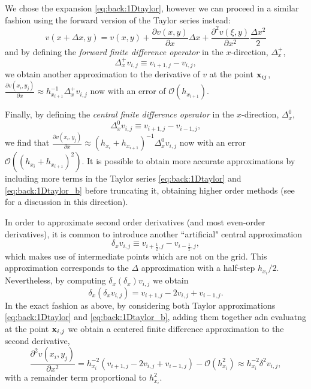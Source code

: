We chose the expansion \eqref{eq:back:1Dtaylor}, however we can proceed in a
similar fashion using the forward version of the Taylor series instead:
\begin{equation}\label{eq:back:1Dtaylor_b}
v(x+\Delta x,y)=
v(x,y)+\frac{\partial v(x,y)}{\partial x}\Delta x + \frac{\partial^2 v(\xi,y)}{\partial x^2}\frac{\Delta x^2}{2}
\end{equation}
and by defining the \emph{forward finite difference operator} in the
$x$-direction, $\Delta^{+}_{x}$,
\begin{equation}\label{eq:back:1DforwardOp}
\Delta^{+}_{x}v_{i,j}\equiv v_{i+1,j}-v_{i,j},
\end{equation}
%
we obtain another approximation to the derivative of $v$ at the point
$\mathbf{x}_{ij}$,\linebreak $\frac{\partial v(x_i,y_j)}{\partial x} \approx h_{x_{i+1}}^{-1}
\Delta^{+}_{x}v_{i,j}$ now with an error of $\mathscr{O}(h_{x_{i+1}})$.

Finally, by defining the \emph{central finite difference operator} in the
$x$-direction, $\Delta^{0}_{x}$,
\begin{equation}\label{eq:back:1DcentralOp}
\Delta^{0}_{x}v_{i,j}\equiv v_{i+1,j}-v_{i-1,j},
\end{equation}
%
we find that $\frac{\partial v(x_i,y_j)}{\partial x}
\approx (h_{x_{i}} + h_{x_{i+1}})^{-1} \Delta^{0}_{x}v_{i,j}$
now with an error $\mathscr{O}\left((h_{x_{i}} + h_{x_{i+1}})^2\right)$. It is
possible to obtain more accurate approximations by including more terms
in the Taylor series \eqref{eq:back:1Dtaylor} and \eqref{eq:back:1Dtaylor_b}
before truncating it, obtaining higher order methods (see \cite{Dem97} for a
discussion in this direction).

In order to approximate second order derivatives (and most even-order derivatives), it is common to introduce another ``artificial" central approximation
\begin{equation}\label{eq:back:1DcentralOp}
\delta_{x}v_{i,j}\equiv v_{i+\frac12,j}-v_{i-\frac12,j},
\end{equation}
which makes use of intermediate points which are not on the grid. This approximation corresponds to the $\Delta$ approximation with a half-step $h_{x_i}/2$.
 Nevertheless, by computing $\delta_x(\delta_x)v_{i,j}$ we obtain
\begin{equation}\label{eq:back:1DcentralOp}
\delta_{x}(\delta_x v_{i,j})= v_{i+1,j}-2v_{i,j}+v_{i-1,j}.
\end{equation}
In the exact fashion as above, by considering both Taylor approximations \eqref{eq:back:1Dtaylor} and \eqref{eq:back:1Dtaylor_b}, adding them together adn evaluatng at the point $\mathbf{x}_{i,j}$ we obtain a centered finite difference approximation to the second derivative,
\begin{equation*}
\frac{\partial^2 v(x_i,y_j)}{\partial x^2} = h_{x_i}^{-2}(v_{i+1,j}-2v_{i,j}+v_{i-1,j})- \mathscr{O}(h_{x_i}^2)\approx h_{x_i}^{-2}\delta^2v_{i,j},
\end{equation*}
with a remainder term proportional to $h_{x_i}^2$.

